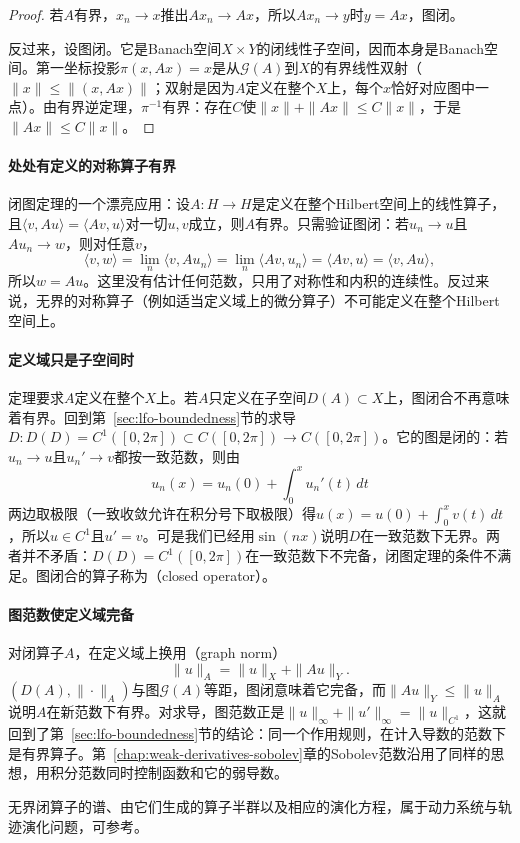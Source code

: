 \begin{proof}
若$A$有界，$x_n\to x$推出$Ax_n\to Ax$，所以$Ax_n\to y$时$y=Ax$，图闭。

反过来，设图闭。它是Banach空间$X\times Y$的闭线性子空间，因而本身是Banach空间。第一坐标投影$\pi(x,Ax)=x$是从$\mathcal G(A)$到$X$的有界线性双射（$\|x\|\leq\|(x,Ax)\|$；双射是因为$A$定义在整个$X$上，每个$x$恰好对应图中一点）。由有界逆定理，$\pi^{-1}$有界：存在$C$使$\|x\|+\|Ax\|\leq C\|x\|$，于是$\|Ax\|\leq C\|x\|$。
\end{proof}

\paragraph{处处有定义的对称算子有界}
闭图定理的一个漂亮应用：设$A:H\to H$是定义在整个Hilbert空间上的线性算子，且$\langle v,Au\rangle=\langle Av,u\rangle$对一切$u,v$成立，则$A$有界。只需验证图闭：若$u_n\to u$且$Au_n\to w$，则对任意$v$，
\[
 \langle v,w\rangle=\lim_n\langle v,Au_n\rangle=\lim_n\langle Av,u_n\rangle=\langle Av,u\rangle=\langle v,Au\rangle ,
\]
所以$w=Au$。这里没有估计任何范数，只用了对称性和内积的连续性。反过来说，无界的对称算子（例如适当定义域上的微分算子）不可能定义在整个Hilbert空间上。

\paragraph{定义域只是子空间时}
定理要求$A$定义在整个$X$上。若$A$只定义在子空间$D(A)\subset X$上，图闭合不再意味着有界。回到第~\ref{sec:lfo-boundedness}节的求导$D:D(D)=C^1([0,2\pi])\subset C([0,2\pi])\to C([0,2\pi])$。它的图是闭的：若$u_n\to u$且$u_n'\to v$都按一致范数，则由
\[
 u_n(x)=u_n(0)+\int_0^xu_n'(t)\,dt
\]
两边取极限（一致收敛允许在积分号下取极限）得$u(x)=u(0)+\int_0^xv(t)\,dt$，所以$u\in C^1$且$u'=v$。可是我们已经用$\sin(nx)$说明$D$在一致范数下无界。两者并不矛盾：$D(D)=C^1([0,2\pi])$在一致范数下不完备，闭图定理的条件不满足。图闭合的算子称为（closed operator）。

\paragraph{图范数使定义域完备}
对闭算子$A$，在定义域上换用（graph norm）
\[
 \|u\|_A=\|u\|_X+\|Au\|_Y .
\]
$(D(A),\|\cdot\|_A)$与图$\mathcal G(A)$等距，图闭意味着它完备，而$\|Au\|_Y\leq\|u\|_A$说明$A$在新范数下有界。对求导，图范数正是$\|u\|_\infty+\|u'\|_\infty=\|u\|_{C^1}$，这就回到了第~\ref{sec:lfo-boundedness}节的结论：同一个作用规则，在计入导数的范数下是有界算子。第~\ref{chap:weak-derivatives-sobolev}章的Sobolev范数沿用了同样的思想，用积分范数同时控制函数和它的弱导数。

无界闭算子的谱、由它们生成的算子半群以及相应的演化方程，属于动力系统与轨迹演化问题，可参考。
